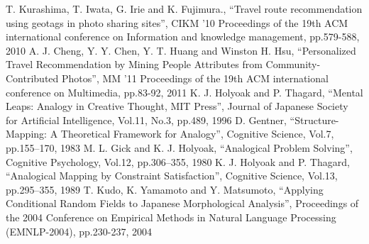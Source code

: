 \documentclass[submit]{ipsj}
\begin{document}
\begin{thebibliography}{11}
    T. Kurashima, T. Iwata, G. Irie and K. Fujimura.,
      ``Travel route recommendation using geotags in photo sharing sites'',
      CIKM '10 Proceedings of the 19th ACM international conference on Information and knowledge management, pp.579-588, 2010
    A. J. Cheng, Y. Y. Chen, Y. T. Huang and Winston H. Hsu,
      ``Personalized Travel Recommendation by Mining People Attributes from Community-Contributed Photos'',
      MM '11 Proceedings of the 19th ACM international conference on Multimedia, pp.83-92, 2011
    K. J. Holyoak and P. Thagard,
      ``Mental Leaps: Analogy in Creative Thought, MIT Press'',
      Journal of Japanese Society for Artificial Intelligence,  Vol.11, No.3,  pp.489, 1996
    D. Gentner,
      ``Structure-Mapping: A Theoretical Framework for Analogy'',
      Cognitive Science, Vol.7, pp.155–170, 1983
    M. L. Gick and K. J. Holyoak,
      ``Analogical Problem Solving'',
      Cognitive Psychology, Vol.12, pp.306–355, 1980
    K. J. Holyoak and P. Thagard,
      ``Analogical Mapping by Constraint Satisfaction'',
      Cognitive Science, Vol.13, pp.295–355, 1989
    T. Kudo, K. Yamamoto and Y. Matsumoto,
      ``Applying Conditional Random Fields to Japanese Morphological Analysis'',
      Proceedings of the 2004 Conference on Empirical Methods in Natural Language Processing (EMNLP-2004), pp.230-237, 2004
\end{thebibliography}

\begin{biography}
%
\end{biography}
\end{document}
